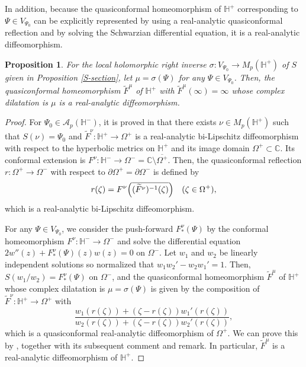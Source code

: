 \documentclass[amstex,12pt,reqno]{amsart}
\newtheorem{proposition}[theorem]{Proposition}
\theoremstyle{definition}
\begin{document}
In addition, because
the quasiconformal homeomorphism of $\mathbb H^+$ corresponding to $\Psi \in V_{\Psi_0}$ can be
explicitly represented by using a real-analytic quasiconformal reflection and by solving the Schwarzian differential equation, it is a real-analytic diffeomorphism.

\begin{proposition}\label{real-analytic}
For the local holomorphic right inverse $\sigma:V_{\Psi_0} \to M_p(\mathbb H^+)$ of $S$
given in Proposition \ref{S-section}, let $\mu=\sigma(\Psi)$ for any $\Psi \in V_{\Psi_0}$.
Then, the quasiconformal homeomorphism $\widetilde F^\mu$ of $\mathbb H^+$ with $\widetilde F^\mu(\infty)=\infty$
whose complex dilatation is $\mu$ is a real-analytic diffeomorphism.
\end{proposition}

\begin{proof}
For $\Psi_0 \in {\mathcal A}_p(\mathbb H^-)$, it is proved in \cite[Lemma 4.3]{WM-1} that there exists
$\nu \in M_p(\mathbb H^+)$ such that $S(\nu)=\Psi_0$ and $\widetilde F^\nu:\mathbb H^+ \to \Omega^+$ 
is a real-analytic bi-Lipschitz diffeomorphism with respect to the hyperbolic metrics on $\mathbb H^+$ and
its image domain $\Omega^+ \subset \mathbb C$. 
Its conformal extension is $F^{\nu}:\mathbb H^- \to \Omega^-={\mathbb C} \setminus \overline{\Omega^+}$. 
Then, the quasiconformal reflection $r:\Omega^+ \to \Omega^-$
with respect to $\partial \Omega^+=\partial \Omega^-$ is defined by 
$$
r(\zeta)=F^\nu\Bigl(\overline{(\widetilde F^{\nu})^{-1}(\zeta)}\Bigr) \quad (\zeta \in \Omega^+),
$$
which is a real-analytic bi-Lipschitz diffeomorphism.

For any $\Psi \in V_{\Psi_0}$, we consider the push-forward $F^\nu_*(\Psi)$ by the conformal
homeomorphism $F^\nu:\mathbb H^- \to \Omega^-$ and solve the differential equation
$2w''(z)+F^\nu_*(\Psi)(z)w(z)=0$ on $\Omega^-$.
Let $w_1$ and $w_2$ be linearly independent solutions so normalized that $w_1w_2'-w_2w_1'=1$.
Then, $S(w_1/w_2)=F^\nu_*(\Psi)$ on $\Omega^-$, 
and
the quasiconformal homeomorphism $\widetilde F^\mu$ of $\mathbb H^+$ whose complex dilatation is $\mu=\sigma(\Psi)$ is given by
the composition of $\widetilde F^\nu:\mathbb H^+ \to \Omega^+$ with
$$
\frac{w_1(r(\zeta))+(\zeta-r(\zeta))w_1'(r(\zeta))}{w_2(r(\zeta))+(\zeta-r(\zeta))w_2'(r(\zeta))},
$$
which is a quasiconformal real-analytic diffeomorphism of $\Omega^+$. We can prove this by \cite[Lemma 4]{Su},
together with its subsequent comment and remark. In particular, $\widetilde F^\mu$ is a real-analytic
diffeomorphism of $\mathbb H^+$.
\end{proof}
\end{document}
